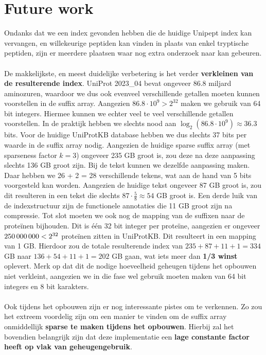 \section{Future work}
Ondanks dat we een index gevonden hebben die de huidige Unipept index kan vervangen, en willekeurige peptiden kan vinden in plaats van enkel tryptische peptiden, zijn er meerdere plaatsen waar nog extra onderzoek naar kan gebeuren.
\\ \\
De makkelijkste, en meest duidelijke verbetering is het verder \textbf{verkleinen van de resulterende index}.
UniProt 2023\_04 bevat ongeveer 86.8 miljard aminozuren, waardoor we dus ook evenveel verschillende getallen moeten kunnen voorstellen in de suffix array.
Aangezien $86.8 \cdot 10^9 > 2^{32}$ maken we gebruik van 64 bit integers.
Hiermee kunnen we echter veel te veel verschillende getallen voorstellen.
In de praktijk hebben we slechts nood aan $\log_2(86.8 \cdot 10^9) \approx 36.3$ bits.
Voor de huidige UniProtKB database hebben we dus slechts 37 bits per waarde in de suffix array nodig.
Aangezien de huidige sparse suffix array (met sparseness factor $k = 3$) ongeveer 235 GB groot is, zou deze na deze aanpassing slechts 136 GB groot zijn.
Bij de tekst kunnen we dezelfde aanpassing maken.
Daar hebben we 26 + 2 = 28 verschillende tekens, wat aan de hand van 5 bits voorgesteld kan worden.
Aangezien de huidige tekst ongeveer 87 GB groot is, zou dit resulteren in een tekst die slechts $87 \cdot \frac{5}{8} \approx 54$ GB groot is.
Een derde luik van de indexstructuur zijn de functionele annotaties die 11 GB groot zijn na compressie.
Tot slot moeten we ook nog de mapping van de suffixen naar de proteïnen bijhouden.
Dit is één 32 bit integer per proteïne, aangezien er ongeveer $250\thinspace000\thinspace000 < 2^{32}$ proteïnen zitten in UniProtKB\@.
Dit resulteert in een mapping van 1 GB\@.
Hierdoor zou de totale resulterende index van $235 + 87 + 11 + 1 = 334$ GB naar $136 + 54 + 11 + 1 = 202$ GB gaan, wat iets meer dan \textbf{1/3 winst} oplevert.
Merk op dat dit de nodige hoeveelheid geheugen tijdens het opbouwen niet verkleint, aangezien we in die fase wel gebruik moeten maken van 64 bit integers en 8 bit karakters.
\\ \\
Ook tijdens het opbouwen zijn er nog interessante pistes om te verkennen.
Zo zou het extreem voordelig zijn om een manier te vinden om de suffix array onmiddellijk \textbf{sparse te maken tijdens het opbouwen}.
Hierbij zal het bovendien belangrijk zijn dat deze implementatie een \textbf{lage constante factor heeft op vlak van geheugengebruik}.
